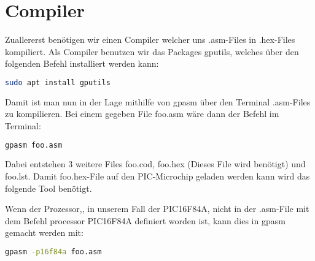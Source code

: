\section{Compiler}
\label{sec:compiler}
Zuallererst benötigen wir einen Compiler welcher uns {\ttfamily .asm}-Files in {\ttfamily .hex}-Files kompiliert. Als Compiler benutzen wir das Packages {\ttfamily gputils}, welches über den folgenden Befehl installiert werden kann:
\begin{lstlisting}[language=bash]
                            sudo apt install gputils
\end{lstlisting}

Damit ist man nun in der Lage mithilfe von {\ttfamily gpasm} über den Terminal {\ttfamily .asm}-Files zu kompilieren. Bei einem gegeben File {\ttfamily foo.asm} wäre dann der Befehl im Terminal:
\begin{lstlisting}[language=bash]
                                gpasm foo.asm
\end{lstlisting} 
Dabei entstehen 3 weitere Files {\ttfamily foo.cod}, {\ttfamily foo.hex} (Dieses File wird benötigt) und {\ttfamily foo.lst}. Damit {\ttfamily foo.hex}-File auf den PIC-Microchip geladen werden kann wird das folgende Tool benötigt.

Wenn der Prozessor,, in unserem Fall der PIC16F84A,  nicht in der {\ttfamily .asm}-File mit dem Befehl {\ttfamily processor	PIC16F84A} definiert worden ist, kann dies in {\ttfamily gpasm} gemacht werden mit:
\begin{lstlisting}[language=bash]
                            gpasm -p16f84a foo.asm
\end{lstlisting} 